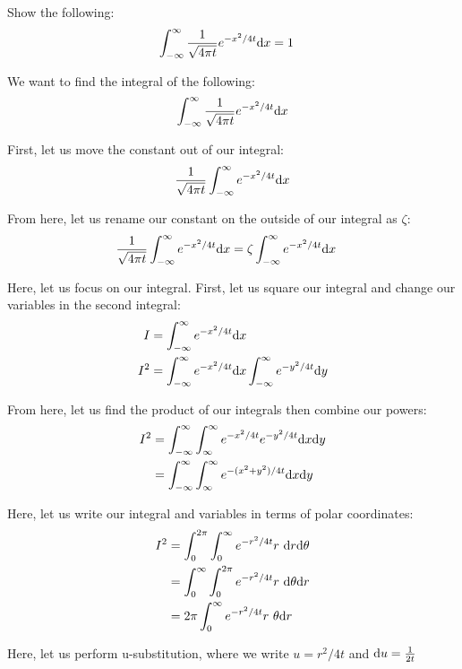 \item Show the following:
%
\begin{align*}
  \int^\infty_{-\infty} \frac{1}{\sqrt{4 \pi t}} e^{-x^2/4t} \text dx & = 1
\end{align*}
\bigbreak

We want to find the integral of the following:
%
\begin{align}
  \int^\infty_{-\infty} \frac{1}{\sqrt{4 \pi t}} e^{-x^2 / 4t} \text dx
\end{align}

First, let us move the constant out of our integral:
%
\begin{align}
  \frac{1}{\sqrt{4 \pi t}} \int^\infty_{-\infty} e^{-x^2 / 4t} \text dx
\end{align}

From here, let us rename our constant on the outside of our integral as $\zeta$:
%
\begin{align}
  \frac{1}{\sqrt{4 \pi t}} \int^\infty_{-\infty} e^{-x^2 / 4t} \text dx
  & = \zeta \int^\infty_{-\infty} e^{-x^2 / 4t} \text dx
\end{align}


Here, let us focus on our integral. First, let us square our integral and change our variables in the second integral:
%
\begin{align}
  I   & = \int^\infty_{-\infty} e^{-x^2/4t} \text dx\\
  I^2 & = \int^\infty_{-\infty} e^{-x^2/4t} \text dx
          \int^\infty_{-\infty} e^{-y^2/4t} \text dy
\end{align}

From here, let us find the product of our integrals then combine our powers:
%
\begin{align}
  I^2
  & = \int^\infty_{-\infty} \int^\infty_{\infty}
      e^{-x^2/4t} e^{-y^2/4t} \text dx \text dy\\
  & = \int^\infty_{-\infty} \int^\infty_{\infty}
      e^{-(x^2 + y^2)/4t} \text dx \text dy\\
\end{align}

Here, let us write our integral and variables in terms of polar
coordinates:
%
\begin{align}
  I^2
  & = \int^{2\pi}_0 \int^\infty_0
      e^{-r^2/4t} r\ \text dr \text d \theta \\
  & = \int^\infty_0 \int^{2\pi}_0
      e^{-r^2/4t} r\ \text d \theta \text dr\\
  & = 2 \pi \int^\infty_0
      e^{-r^2/4t} r\ \theta \text dr\\
\end{align}

Here, let us perform u-substitution, where we write $u = r^2/4t$ and $\text du = \frac{1}{2t}$
